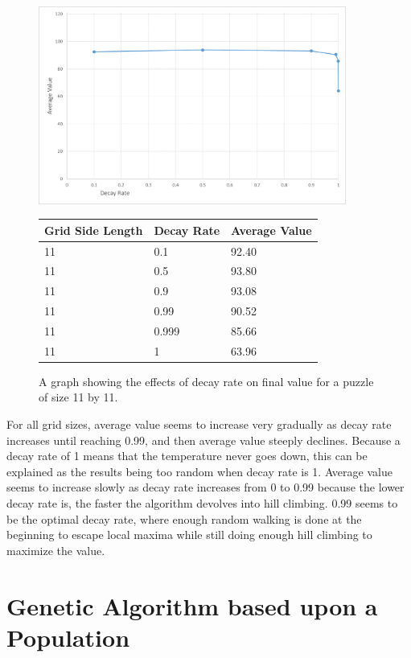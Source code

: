 \documentclass[12pt]{article}
\begin{document}
\begin{figure}[H]
    \centering
    \includegraphics[width=0.9\textwidth]{simulated_annealing_11x11_decay_excel}
\begin{tabular}{ |p{4cm}||p{4cm}|p{4cm}|  }
 \hline
Grid Side Length& Decay Rate &Average Value\\
 \hline
11&0.1&92.40\\
11&0.5&93.80\\
11&0.9&93.08\\
11&0.99&90.52\\
11&0.999&85.66\\
11&1&63.96\\
 \hline
\end{tabular}
    \caption{A graph showing the effects of decay rate on final value for a puzzle of size 11 by 11.}
    \label{fig:simulated_annealing_11x11_decay}
\end{figure}

For all grid sizes, average value seems to increase very gradually as decay rate increases until reaching 0.99, and then average value steeply declines. Because a decay rate of 1 means that the temperature never goes down, this can be explained as the results being too random when decay rate is 1. Average value seems to increase slowly as decay rate increases from 0 to 0.99 because the lower decay rate is, the faster the algorithm devolves into hill climbing. 0.99 seems to be the optimal decay rate, where enough random walking is done at the beginning to escape local maxima while still doing enough hill climbing to maximize the value.

\section*{Genetic Algorithm based upon a Population}
\end{document}
